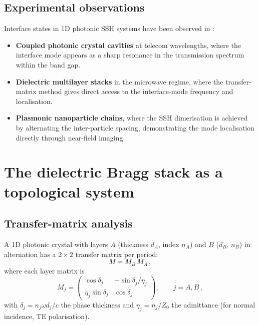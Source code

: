 \subsection{Experimental observations}
\label{sec:ch14-experiments}

Interface states in 1D photonic SSH systems have been observed in
\cite{ozawa2018topological,price2022roadmap}:
\begin{itemize}
  \item \textbf{Coupled photonic crystal cavities} at telecom wavelengths,
  where the interface mode appears as a sharp resonance in the
  transmission spectrum within the band gap.
  \item \textbf{Dielectric multilayer stacks} in the microwave regime,
  where the transfer-matrix method gives direct access to the
  interface-mode frequency and localisation.
  \item \textbf{Plasmonic nanoparticle chains}, where the SSH
  dimerisation is achieved by alternating the inter-particle spacing,
  demonstrating the mode localisation directly through near-field
  imaging.
\end{itemize}

\section{The dielectric Bragg stack as a topological system}
\label{sec:ch14-bragg-stack}

\subsection{Transfer-matrix analysis}
\label{sec:ch14-transfer}

A 1D photonic crystal with layers $A$ (thickness $d_A$, index $n_A$)
and $B$ ($d_B$, $n_B$) in alternation has a $2\times 2$ transfer matrix
per period:
\begin{equation}\label{eq:ch14-transfer-matrix}
  M = M_B\,M_A\,,
\end{equation}
where each layer matrix is
\begin{equation}\label{eq:ch14-layer-matrix}
  M_j = \begin{pmatrix}
    \cos\delta_j & -\sin\delta_j/\eta_j \\
    \eta_j\sin\delta_j & \cos\delta_j
  \end{pmatrix},
  \qquad j=A,B\,,
\end{equation}
with $\delta_j=n_j\omega d_j/c$ the phase thickness and
$\eta_j=n_j/Z_0$ the admittance (for normal incidence, TE
polarisation).

